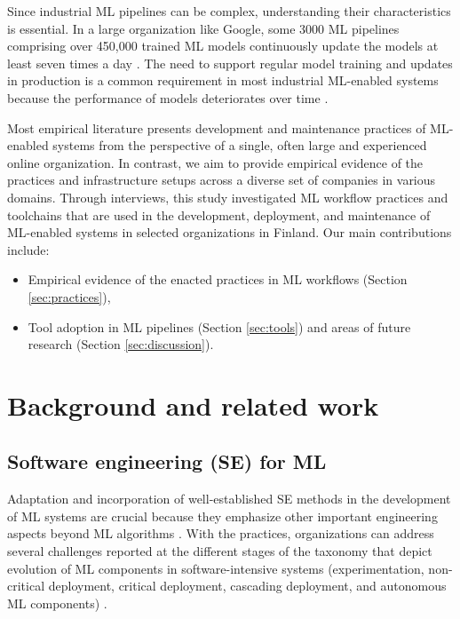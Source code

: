 \documentclass{IEEEcsmag}
\begin{document}
Since industrial ML pipelines can be complex, understanding their characteristics is essential. In a large organization like Google, some 3000 ML pipelines comprising over 450,000 trained ML models continuously update the models at least seven times a day  \cite{Doris2021MLPipelines}. The need to support regular model training and updates in production is a common requirement in most industrial ML-enabled systems because the performance of models deteriorates over time  \cite{Sculley2015}.

Most empirical literature presents development and maintenance practices of ML-enabled systems from the perspective of a single, often large and experienced online organization. In contrast, we aim to provide empirical evidence of the practices and infrastructure setups across a diverse set of companies in various domains. Through interviews, this study investigated ML workflow practices and toolchains that are used in the development, deployment, and maintenance of ML-enabled systems in selected organizations in Finland. Our main contributions include:
\begin{itemize}
    \item Empirical evidence of the enacted practices in ML workflows  (Section \ref{sec:practices}),
    \item Tool adoption in ML pipelines (Section \ref{sec:tools}) and areas of future research (Section \ref{sec:discussion}).
\end{itemize}
 

\section{\textbf{Background and related work}}
\label{sec:background}

\subsection{Software engineering (SE) for ML}
Adaptation and incorporation of well-established SE methods in the development of ML systems are crucial \cite{Amershi2019}because they emphasize other important engineering aspects beyond ML algorithms \cite{Sculley2015}. With the practices, organizations can address several challenges reported at the different stages of the taxonomy that depict evolution of ML components in software-intensive systems (experimentation, non-critical deployment, critical deployment, cascading deployment, and autonomous ML components) \cite{Lwakatare2019}.
\end{document}
